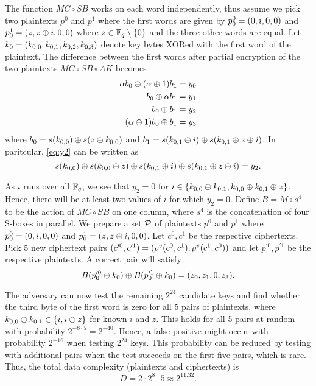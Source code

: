 \documentclass[twoside]{article}
\begin{document}
The function \(MC \circ SB\) works on each word independently, thus assume we
pick two plaintexts \(p^0\) and \(p^1\) where the first words are given by
\(p_0^0 = (0, i, 0, 0)\) and \(p_0^1 = (z, z \oplus i, 0, 0)\) where
\(z \in \mathbb F_q \setminus \{0\}\) and the three other words are equal. Let
\(k_0 = (k_{0, 0}, k_{0, 1}, k_{0, 2}, k_{0, 3})\) denote key bytes XORed
with the first word of the plaintext. The difference between the first words
after partial encryption of the two plaintexts \(MC \circ SB \circ AK\) becomes
\begin{align}
    \alpha b_0 \oplus (\alpha \oplus 1)b_1 &= y_0 \\
    b_0 \oplus \alpha b_1 &= y_1 \\
    b_0 \oplus b_1 &= y_2 \label{eq:y2} \\
    (\alpha \oplus 1)b_0 \oplus b_1 &= y_3
\end{align}
where \(b_0 = s(k_{0, 0}) \oplus s(z \oplus k_{0, 0})\) and \(b_1 =
s(k_{0, 1} \oplus i) \oplus s(k_{0, 1} \oplus z \oplus i)\). In
paritcular, \eqref{eq:y2} can be written as
\begin{equation}
    s(k_{0, 0}) \oplus s(k_{0, 0} \oplus z) \oplus s(k_{0, 1} \oplus i) \oplus s(k_{0, 1} \oplus z \oplus i) = y_2.
\end{equation}

As \(i\) runs over all \(\mathbb F_q\), we see that \(y_2 = 0\) for \(i \in
\{k_{0, 0} \oplus k_{0, 1}, k_{0, 0} \oplus k_{0, 1} \oplus z\}\). Hence,
there will be at least two values of \(i\) for which \(y_2 = 0\). Define \(B = M
\circ s^4\) to be the action of \(MC \circ SB\) on one column, where \(s^4\) is
the concatenation of four S-boxes in parallel. We prepare a set \(\mathcal P\) of
plaintexts \(p^0\) and \(p^1\) where \(p_0^0 = (0, i, 0, 0)\) and \(p_0^1 =
(z, z \oplus i, 0, 0)\). Let \(c^0, c^1\) be the respective ciphertexts.
Pick 5 new ciphertext pairs \((c^{\prime 0}, c^{\prime 1}) =
(\rho^v(c^0, c^1), \rho^v(c^1, c^0))\) and let \(p^{\prime 0},
p^{\prime 1}\) be the respective plaintexts. A correct pair will satisfy
\begin{equation}
    B(p_0^{\prime 0} \oplus k_0) \oplus B(p_0^{\prime 1} \oplus k_0) = (z_0, z_1, 0, z_3).
    \label{eq:aes-5-rounds-check}
\end{equation}

The adversary can now test the remaining \(2^{24}\) candidate keys and find
whether the third byte of the first word is zero for all 5 pairs of plaintexts,
where \(k_{0, 0} \oplus k_{0, 1} \in \{i, i \oplus z\}\) for known \(i\) and
\(z\). This holds for all 5 pairs at random with probability \(2^{-8 \cdot 5} =
2^{-40}\). Hence, a false positive might occur with probability \(2^{-16}\) when
testing \(2^{24}\) keys. This probability can be reduced by testing with
additional pairs when the test succeeds on the first five pairs, which is rare.
Thus, the total data complexity (plaintexts and ciphertexts) is
\begin{equation}
    D = 2 \cdot 2^8 \cdot 5 \approx 2^{11.32}.
\end{equation}
\end{document}

